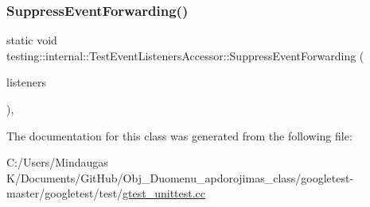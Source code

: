 \mbox{\label{classtesting_1_1internal_1_1_test_event_listeners_accessor_abfc0a0f8163465f4f5d42436ec8c7cb3}} 
\subsubsection{\texorpdfstring{SuppressEventForwarding()}{SuppressEventForwarding()}\hspace{0.1cm}{\footnotesize\ttfamily [3/3]}}
{\footnotesize\ttfamily static void testing\+::internal\+::\+Test\+Event\+Listeners\+Accessor\+::\+Suppress\+Event\+Forwarding (\begin{DoxyParamCaption}\item[{\mbox{\hyperlink{classtesting_1_1_test_event_listeners}{Test\+Event\+Listeners}} $\ast$}]{listeners }\end{DoxyParamCaption})\hspace{0.3cm}{\ttfamily [inline]}, {\ttfamily [static]}}



The documentation for this class was generated from the following file\+:\begin{DoxyCompactItemize}
\item 
C\+:/\+Users/\+Mindaugas K/\+Documents/\+Git\+Hub/\+Obj\+\_\+\+Duomenu\+\_\+apdorojimas\+\_\+class/googletest-\/master/googletest/test/\mbox{\hyperlink{googletest-master_2googletest_2test_2gtest__unittest_8cc}{gtest\+\_\+unittest.\+cc}}\end{DoxyCompactItemize}
